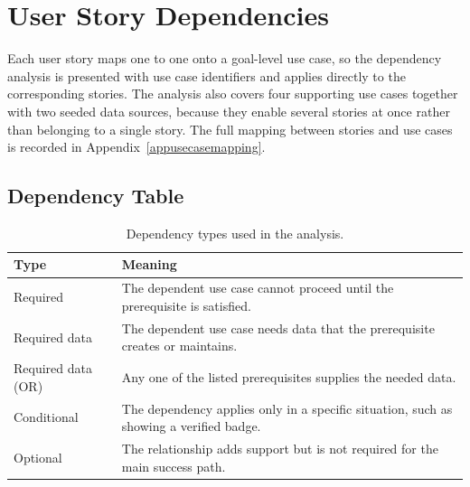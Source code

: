 \documentclass[11pt,a4paper]{article}
\begin{document}
\section{User Story Dependencies}
\label{secdependencies}

Each user story maps one to one onto a goal-level use case, so the dependency analysis is presented with use case identifiers and applies directly to the corresponding stories. The analysis also covers four supporting use cases together with two seeded data sources, because they enable several stories at once rather than belonging to a single story. The full mapping between stories and use cases is recorded in Appendix~\ref{appusecasemapping}.

\subsection{Dependency Table}

\begin{table}[H]
    \centering
    \small
    \caption{Dependency types used in the analysis.}
    \begin{tabularx}{\textwidth}{@{}L{4.2cm}Y@{}}
        \toprule
        Type & Meaning\\
        \midrule
        Required & The dependent use case cannot proceed until the prerequisite is satisfied.\\
        Required data & The dependent use case needs data that the prerequisite creates or maintains.\\
        Required data (OR) & Any one of the listed prerequisites supplies the needed data.\\
        Conditional & The dependency applies only in a specific situation, such as showing a verified badge.\\
        Optional & The relationship adds support but is not required for the main success path.\\
        \bottomrule
    \end{tabularx}
    \label{tabdependencytypes}
\end{table}
\end{document}
